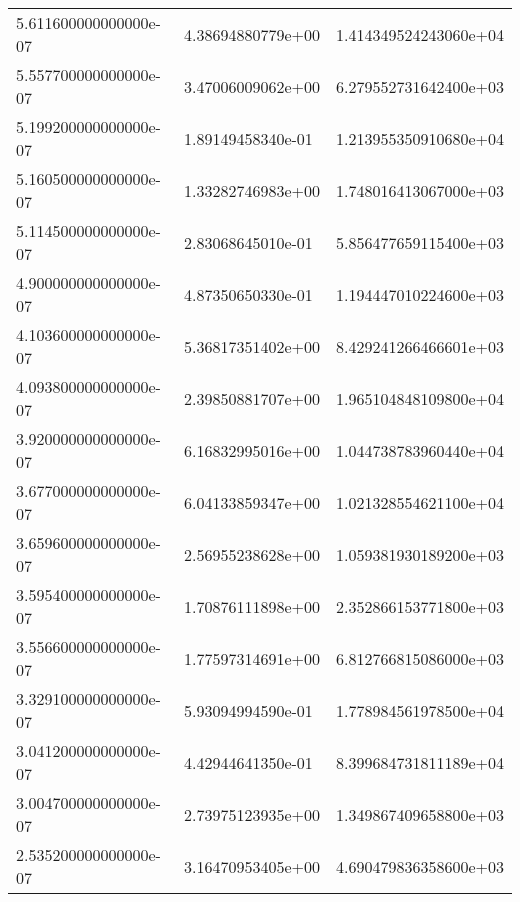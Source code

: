 \begin{center}
{\begin{xtabular}{|l|l|l|}
5.611600000000000e-07 & 4.38694880779e+00 & 1.414349524243060e+04 \\ 
5.557700000000000e-07 & 3.47006009062e+00 & 6.279552731642400e+03 \\ 
5.199200000000000e-07 & 1.89149458340e-01 & 1.213955350910680e+04 \\ 
5.160500000000000e-07 & 1.33282746983e+00 & 1.748016413067000e+03 \\ 
5.114500000000000e-07 & 2.83068645010e-01 & 5.856477659115400e+03 \\ 
4.900000000000000e-07 & 4.87350650330e-01 & 1.194447010224600e+03 \\ 
4.103600000000000e-07 & 5.36817351402e+00 & 8.429241266466601e+03 \\ 
4.093800000000000e-07 & 2.39850881707e+00 & 1.965104848109800e+04 \\ 
3.920000000000000e-07 & 6.16832995016e+00 & 1.044738783960440e+04 \\ 
3.677000000000000e-07 & 6.04133859347e+00 & 1.021328554621100e+04 \\ 
3.659600000000000e-07 & 2.56955238628e+00 & 1.059381930189200e+03 \\ 
3.595400000000000e-07 & 1.70876111898e+00 & 2.352866153771800e+03 \\ 
3.556600000000000e-07 & 1.77597314691e+00 & 6.812766815086000e+03 \\ 
3.329100000000000e-07 & 5.93094994590e-01 & 1.778984561978500e+04 \\ 
3.041200000000000e-07 & 4.42944641350e-01 & 8.399684731811189e+04 \\ 
3.004700000000000e-07 & 2.73975123935e+00 & 1.349867409658800e+03 \\ 
2.535200000000000e-07 & 3.16470953405e+00 & 4.690479836358600e+03 \\
\end{xtabular}}
\end{center}
 \label{tab:L2}
%
%
\tablelasttail{\hline \hline}
